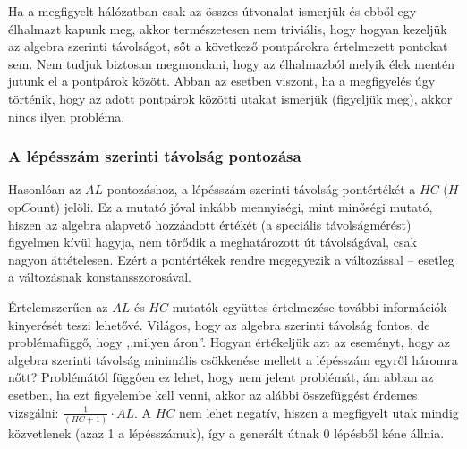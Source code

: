     \begin{note}
      Ha a megfigyelt hálózatban csak az összes útvonalat ismerjük és ebből egy élhalmazt kapunk meg, akkor természetesen nem triviális, hogy hogyan kezeljük az algebra szerinti távolságot, sőt a következő pontpárokra értelmezett pontokat sem. Nem tudjuk biztosan megmondani, hogy az élhalmazból melyik élek mentén jutunk el a pontpárok között. Abban az esetben viszont, ha a megfigyelés úgy történik, hogy az adott pontpárok közötti utakat ismerjük (figyeljük meg), akkor nincs ilyen probléma.
    \end{note}

    \subsubsection{A lépésszám szerinti távolság pontozása}
    Hasonlóan az $AL$ pontozáshoz, a lépésszám szerinti távolság pontértékét a $HC$ ($H$op$C$ount) jelöli. Ez a mutató jóval inkább mennyiségi, mint minőségi mutató, hiszen az algebra alapvető hozzáadott értékét (a speciális távolságmérést) figyelmen kívül hagyja, nem törődik a meghatározott út távolságával, csak nagyon áttételesen. Ezért a pontértékek rendre megegyezik a változással -- esetleg a változásnak konstansszorosával.

    \begin{note}\label{AL-HC}
      Értelemszerűen az $AL$ és $HC$ mutatók együttes értelmezése további információk kinyerését teszi lehetővé. Világos, hogy az algebra szerinti távolság fontos, de problémafüggő, hogy ,,milyen áron''. Hogyan értékeljük azt az eseményt, hogy az algebra szerinti távolság minimális csökkenése mellett a lépésszám egyről háromra nőtt? Problémától függően ez lehet, hogy nem jelent problémát, ám abban az esetben, ha ezt figyelembe kell venni, akkor az alábbi összefüggést érdemes vizsgálni: $\frac{1}{(HC+1)} \cdot AL$. A $HC$ nem lehet negatív, hiszen a megfigyelt utak mindig közvetlenek (azaz 1 a lépésszámuk), így a generált útnak 0 lépésből kéne állnia.
    \end{note}

    \iffalse
    \subsubsection{Az út során érintett köztes csomópontok pontozása}
    A két csomópont közti út során érintett csúcsok pontértékét az $IV$ ($I$nside$V$ertices) jelöli. Ez a mutató algebra függő, mert vannak olyan problémák, ahol teljesen lényegtelen, hogy milyen csomópontokon halad végig az út, máshol viszont ez magát az útvonalválasztást befolyásoló tényező. Az algebrafüggésből adódóan itt a három eset (pontos, jobb, rosszabb) további pontosításra szorul\footnote{Ezt mindig az aktuális vizsgálatnál kell megtenni, lásd \aref{test}. fejezetet.}, a pontértékük rendre 5, 4 és 1 pont, hasonlóan a $HC$ mutatóhoz.
    \fi

